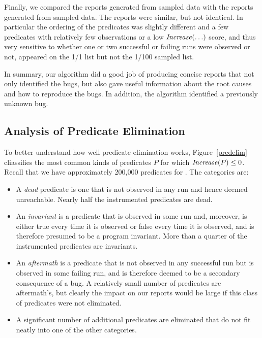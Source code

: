 Finally, we compared the reports generated from  sampled data
with the reports generated from  sampled data.  The reports were
similar, but not identical.  In particular the ordering of the
predicates was slightly different and a few predicates with relatively
few observations or a low $\mbox{\textit{Increase}}(\ldots)$ score, and thus very
sensitive to whether one or two successful or failing runs were
observed or not, appeared on
the 1/1 list but not the 1/100 sampled list.

In summary, our algorithm did a good job of producing concise reports that not
only identified the bugs, but also gave useful information about the root causes and
how to reproduce the bugs.  In addition, the algorithm identified a previously unknown
bug.
 
\subsection{Analysis of Predicate Elimination}

To better understand how well predicate elimination works,
Figure~\ref{predelim} cliassifies the most common kinds of predicates
$P$ for which $\mbox{\textit{Increase}}(P) \leq 0$.  Recall that we have
approximately 200,000 predicates for \moss.  The categories are:

\begin{itemize}  
\item  A {\it dead} predicate is one that is not observed in any run and hence
deemed unreachable.  Nearly half the instrumented predicates are dead.

\item An {\it invariant} is a predicate that is observed in some run and, moreover,
is either true every time it is observed or false every time it is observed,
and is therefore presumed to be a program invariant.  More than a quarter of
the instrumented predicates are invariants.

\item An {\it aftermath} is a predicate that is not observed in any successful run but
is observed in some failing run, and is therefore deemed to be a secondary consequence
of a bug.  A relatively small number of predicates are aftermath's, but clearly
the impact on our reports would be large if this class of predicates were not eliminated.

\item A significant number of additional predicates are eliminated that do not fit
neatly into one of the other categories.

\end{itemize}

